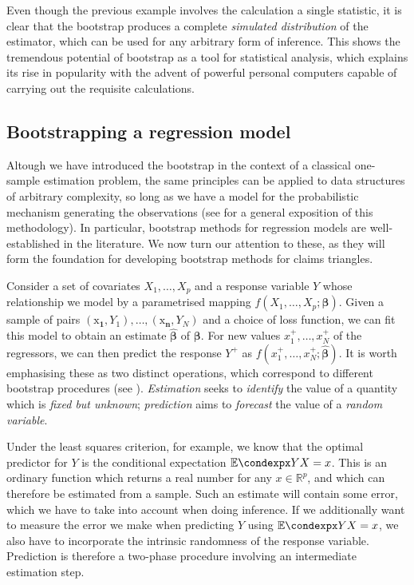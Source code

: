 \documentclass[a4paper]{book}
\begin{document}
Even though the previous example involves the calculation a single statistic, it is clear that the bootstrap produces a complete \emph{simulated distribution} of the estimator, which can be used for any arbitrary form of inference. This shows the tremendous potential of bootstrap as a tool for statistical analysis, which explains its rise in popularity with the advent of powerful personal computers capable of carrying out the requisite calculations.

\subsection{Bootstrapping a regression model} \label{subsec:boot-reg}

Altough we have introduced the bootstrap in the context of a classical one-sample estimation problem, the same principles can be applied to data structures of arbitrary complexity, so long as we have a model for the probabilistic mechanism generating the observations (see \cite[Chapter 8]{efron:intro} for a general exposition of this methodology). In particular, bootstrap methods for regression models are well-established in the literature. We now turn our attention to these, as they will form the foundation for developing bootstrap methods for claims triangles.

Consider a set of covariates $X_1, \dots, X_p$ and a response variable $Y$ whose relationship we model by a parametrised mapping $f(X_1, \dots, X_p; \bm{\beta})$. Given a sample of pairs $(\bm{\mathrm{x}_1}, Y_1), \dots, (\bm{\mathrm{x}_n}, Y_N)$ and a choice of loss function, we can fit this model to obtain an estimate $\widehat{\bm{\beta}}$ of $\bm{\beta}$. For new values $x_1^+, \dots, x_N^+$ of the regressors, we can then predict the response $Y^+$ as $f(x_1^+, \dots, x_N^+; \widehat{\bm{\beta}})$. It is worth emphasising these as two distinct operations, which correspond to different bootstrap procedures (see \cite[Sections 6.3.3 and 7.2.4]{davison}). \emph{Estimation} seeks to \emph{identify} the value of a quantity which is \emph{fixed but unknown}; \emph{prediction} aims to \emph{forecast} the value of a \emph{random variable}. 

Under the least squares criterion, for example, we know that the optimal predictor for $Y$ is the conditional expectation $\condexp{Y}{X = x}$. This is an ordinary function which returns a real number for any $x \in \mathbb{R}^p$, and which can therefore be estimated from a sample. Such an estimate will contain some error, which we have to take into account when doing inference. If we additionally want to measure the error we make when predicting $Y$ using $\condexp{Y}{X = x}$, we also have to incorporate the intrinsic randomness of the response variable. Prediction is therefore a two-phase procedure involving an intermediate estimation step.
\end{document}
